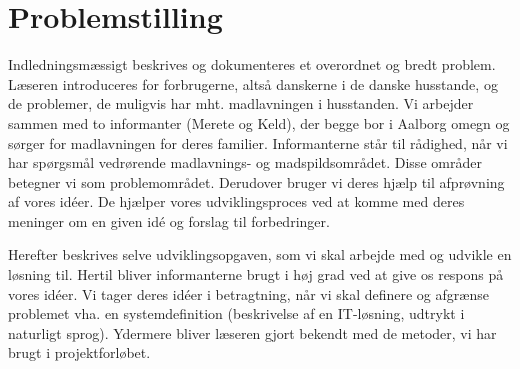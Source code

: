 \chapter{Problemstilling}
\label{chap:problemstilling}

Indledningsmæssigt beskrives og dokumenteres et overordnet og bredt problem. Læseren introduceres for forbrugerne, altså danskerne i de danske husstande, og de problemer, de muligvis har mht. madlavningen i husstanden. Vi arbejder sammen med to informanter (Merete og Keld), der begge bor i Aalborg omegn og sørger for madlavningen for deres familier. Informanterne står til rådighed, når vi har spørgsmål vedrørende \fx madlavnings- og madspildsområdet. Disse områder betegner vi som problemområdet. Derudover bruger vi deres hjælp til afprøvning af vores idéer. De hjælper vores udviklingsproces ved at komme med deres meninger om en given idé og forslag til forbedringer.

Herefter beskrives selve udviklingsopgaven, som vi skal arbejde med og udvikle en løsning til. Hertil bliver informanterne brugt i høj grad ved at give os respons på vores idéer. Vi tager deres idéer i betragtning, når vi skal definere og afgrænse problemet vha. en systemdefinition (beskrivelse af en IT-løsning, udtrykt i naturligt sprog). Ydermere bliver læseren gjort bekendt med de metoder, vi har brugt i projektforløbet.

%



